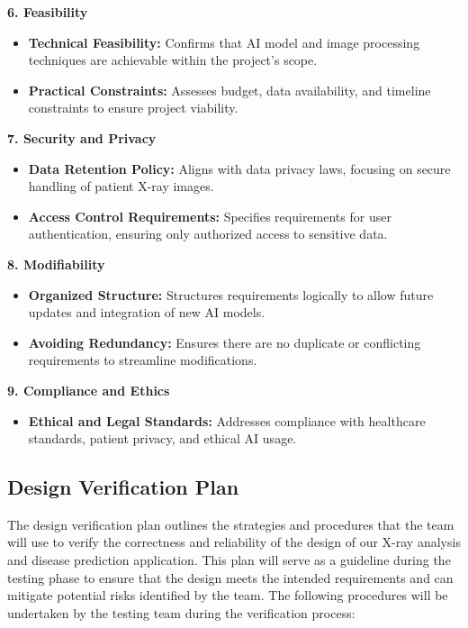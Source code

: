 \documentclass[12pt, titlepage]{article}
\begin{document}
\textbf{6. Feasibility} 
\begin{itemize}
    \item \textbf{Technical Feasibility:} Confirms that AI model and image processing techniques are achievable within the project's scope. 
    \item \textbf{Practical Constraints:} Assesses budget, data availability, and timeline constraints to ensure project viability. 
\end{itemize}

\textbf{7. Security and Privacy} 
\begin{itemize}
    \item \textbf{Data Retention Policy:} Aligns with data privacy laws, focusing on secure handling of patient X-ray images. 
    \item \textbf{Access Control Requirements:} Specifies requirements for user authentication, ensuring only authorized access to sensitive data. 
\end{itemize}
\textbf{8. Modifiability} 
\begin{itemize}
    \item \textbf{Organized Structure:} Structures requirements logically to allow future updates and integration of new AI models. 
    \item \textbf{Avoiding Redundancy:} Ensures there are no duplicate or conflicting requirements to streamline modifications. 
\end{itemize}
\textbf{9. Compliance and Ethics} 
\begin{itemize}
    \item \textbf{Ethical and Legal Standards:} Addresses compliance with healthcare standards, patient privacy, and ethical AI usage. 
\end{itemize}

\subsection{Design Verification Plan}

The design verification plan outlines the strategies and procedures that the team will use to verify the correctness and reliability of the design of our X-ray analysis and disease prediction application. This plan will serve as a guideline during the testing phase to ensure that the design meets the intended requirements and can mitigate potential risks identified by the team. The following procedures will be undertaken by the testing team during the verification process:
\end{document}
